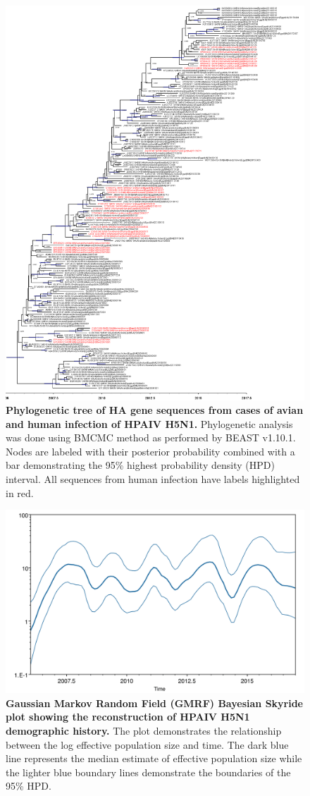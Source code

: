 \documentclass[10pt,english]{article}
\begin{document}
\clearpage
\begin{figure}[!ht]
  \center
  \includegraphics[width=.75\textwidth]{./figures/annotated_combined.png}
  \caption{\textbf{Phylogenetic tree of HA gene sequences from cases of avian and human infection of HPAIV H5N1.} Phylogenetic analysis was done using BMCMC method as performed by BEAST v1.10.1. Nodes are labeled with their posterior probability combined with a bar demonstrating the 95\% highest probability density (HPD) interval. All sequences from human infection have labels highlighted in red.}
  \label{gene-tree}
\end{figure}
\clearpage

\clearpage
\begin{figure}[!ht]
  \center
  \includegraphics[width=.75\textwidth]{./figures/gmrf-plot.png}
  \caption{\textbf{Gaussian Markov Random Field (GMRF) Bayesian Skyride plot showing the reconstruction of HPAIV H5N1 demographic history.} The plot demonstrates the relationship between the log effective population size and time. The dark blue line represents the median estimate of effective population size while the lighter blue boundary lines demonstrate the boundaries of the 95\% HPD.}
  \label{gmrf-plot}
\end{figure}
\clearpage
\end{document}
